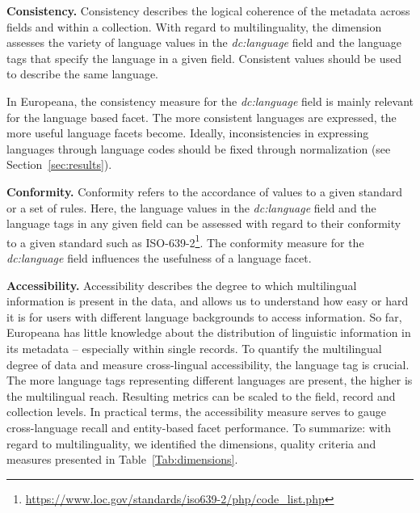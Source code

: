 \noindent \textbf{Consistency.}
Consistency describes the logical coherence of the metadata across fields and within a collection. With regard to multilinguality, the dimension assesses the variety of language values in the \textit{dc:language} field and the language tags that specify the language in a given field. Consistent values should be used to describe the same language.

In Europeana, the consistency measure for the \textit{dc:language} field is mainly relevant for the language based facet. The more consistent languages are expressed, the more useful language facets become. Ideally, inconsistencies in expressing languages through language codes should be fixed through normalization (see Section~\ref{sec:results}).

\noindent \textbf{Conformity.}
Conformity refers to the accordance of values to a given standard or a set of rules. Here, the language values in the \textit{dc:language} field and the language tags in any given field can be assessed with regard to their conformity to a given standard such as ISO-639-2\footnote{ \url{https://www.loc.gov/standards/iso639-2/php/code_list.php}}.
The conformity measure for the \textit{dc:language} field influences the usefulness of a language facet. 

\noindent\textbf{Accessibility.}
Accessibility describes the degree to which multilingual information is present in the data, and allows us to understand how easy or hard it is for users with different language backgrounds to access information. So far, Europeana has little knowledge about the distribution of linguistic information in its metadata -- especially within single records. To quantify the multilingual degree of data and measure cross-lingual accessibility, the language tag is crucial. The more language tags representing different languages are present, the higher is the multilingual reach. Resulting metrics can be scaled to the field, record and collection levels. In practical terms, the accessibility measure serves to gauge cross-language recall and entity-based facet performance.
To summarize: with regard to multilinguality, we identified the dimensions, quality criteria and measures presented in Table~\ref{Tab:dimensions}.

